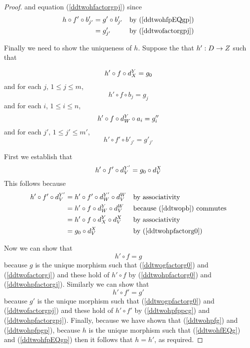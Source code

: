 \documentclass[10pt,a4paper]{scrartcl}
\begin{document}
\begin{proof}
\noindent
and equation (\ref{ddtwohfactorgpj}) since
\begin{align*}
h \circ f' \circ b'_{j'}       &= g' \circ b'_{j'}  && \mbox{by (\ref{ddtwohfpEQgp})} \\
                          &= g'_{j'}                && \mbox{by (\ref{ddtwofactorgpj})} 
\end{align*}


\noindent
Finally we need to show the uniqueness of $h$. Suppose the that $h': D \rightarrow Z$ such that

\begin{equation}
\label{ddtwohpfactorg0}
h' \circ f \circ d^{Y}_{X} = g_0
\end{equation}
and for each $j$, $1 \leq j \leq m$,
\begin{equation}
\label{ddtwohpfactorgj}
h' \circ f \circ b_j = g_j
\end{equation}
and for each $i$, $1 \leq i \leq n$,
\begin{equation}
\label{ddtwohpfactorgppi}
h' \circ f \circ d^{Y}_{W} \circ a_i = g''_i
\end{equation}
 and for each $j'$, $1 \leq j' \leq m'$,
\begin{equation}
\label{ddtwohpfactorgpj}
h' \circ f' \circ b'_{j'} = g'_{j'}
\end{equation}

\noindent
First we establish that
\begin{equation}
\label{ddtwohpfppcg}
h' \circ f' \circ d^{Y'}_{V}  =  g_0 \circ d^{X}_{V}
\end{equation}
\noindent
This follows because
\begin{align*}
h' \circ f' \circ d^{Y'}_{V} 
&= h' \circ f' \circ d^{Y'}_{W} \circ d^{W}_{V} && \mbox{by associativity} \\
&= h' \circ f \circ d^{Y}_{W} \circ d^{W}_{V} && \mbox{because (\ref{ddtwopb}) commutes} \\
&= h' \circ f \circ d^{Y}_{X} \circ d^{X}_{V} && \mbox{by associativity} \\
&= g_0 \circ d^{X}_{V}                        && \mbox{by (\ref{ddtwohpfactorg0})}
\end{align*}

\noindent
Now we can show that
\begin{equation}
\label{ddtwohpfg}
h' \circ f  =  g
\end{equation}
because $g$ is the unique morphism such that (\ref{ddtwogfactorg0}) and
(\ref{ddtwofactorgj}) and these hold of $h' \circ f$ 
by (\ref{ddtwohpfactorg0}) and (\ref{ddtwohpfactorgj}).
\noindent
Similarly we can show that
\begin{equation}
\label{ddtwohpfpgp}
h' \circ f'  =  g'
\end{equation}
because $g'$ is the unique morphism such that (\ref{ddtwogpfactorg0}) and (\ref{ddtwofactorgpj}) and these hold of $h' \circ f'$ by (\ref{ddtwohpfppcg}) and (\ref{ddtwohpfactorgpj}).
\noindent
Finally, because we have shown that (\ref{ddtwohpfg}) and (\ref{ddtwohpfpgp}), because $h$ is the unique morphism 
such that (\ref{ddtwohfEQg}) and (\ref{ddtwohfpEQgp}) then
it follows that $h=h'$, as required.
\end{proof} %
\end{document}
